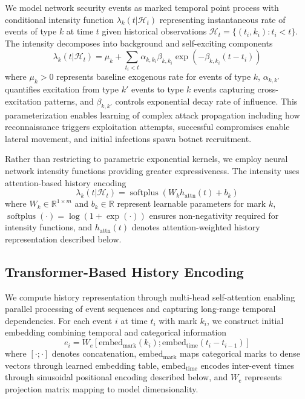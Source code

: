\documentclass[10pt,journal,compsoc]{IEEEtran}
\newcommand{\R}{\mathbb{R}}
\newcommand{\softplus}{\operatorname{softplus}}
\begin{document}
We model network security events as marked temporal point process with conditional intensity function $\lambda_k(t | \mathcal{H}_t)$ representing instantaneous rate of events of type $k$ at time $t$ given historical observations $\mathcal{H}_t = \{(t_i, k_i) : t_i < t\}$. The intensity decomposes into background and self-exciting components
\begin{equation}
\lambda_k(t | \mathcal{H}_t) = \mu_k + \sum_{t_i < t} \alpha_{k,k_i} \beta_{k,k_i} \exp(-\beta_{k,k_i}(t - t_i))
\label{eq:hawkes_intensity}
\end{equation}
where $\mu_k > 0$ represents baseline exogenous rate for events of type $k$, $\alpha_{k,k'}$ quantifies excitation from type $k'$ events to type $k$ events capturing cross-excitation patterns, and $\beta_{k,k'}$ controls exponential decay rate of influence. This parameterization enables learning of complex attack propagation including how reconnaissance triggers exploitation attempts, successful compromises enable lateral movement, and initial infections spawn botnet recruitment.

Rather than restricting to parametric exponential kernels, we employ neural network intensity functions providing greater expressiveness. The intensity uses attention-based history encoding
\begin{equation}
\lambda_k(t | \mathcal{H}_t) = \softplus\left(W_k h_{\text{attn}}(t) + b_k\right)
\end{equation}
where $W_k \in \R^{1 \times m}$ and $b_k \in \R$ represent learnable parameters for mark $k$, $\softplus(\cdot) = \log(1 + \exp(\cdot))$ ensures non-negativity required for intensity functions, and $h_{\text{attn}}(t)$ denotes attention-weighted history representation described below.

\subsection{Transformer-Based History Encoding}

We compute history representation through multi-head self-attention enabling parallel processing of event sequences and capturing long-range temporal dependencies. For each event $i$ at time $t_i$ with mark $k_i$, we construct initial embedding combining temporal and categorical information
\begin{equation}
e_i = W_e \left[\text{embed}_{\text{mark}}(k_i); \text{embed}_{\text{time}}(t_i - t_{i-1})\right]
\end{equation}
where $[\cdot; \cdot]$ denotes concatenation, $\text{embed}_{\text{mark}}$ maps categorical marks to dense vectors through learned embedding table, $\text{embed}_{\text{time}}$ encodes inter-event times through sinusoidal positional encoding described below, and $W_e$ represents projection matrix mapping to model dimensionality.
\end{document}
